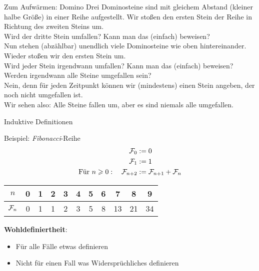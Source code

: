 \begin{frame}{Zum Aufwärmen: Domino}
	Drei Dominosteine sind mit gleichem Abstand (kleiner halbe Größe) in einer Reihe aufgestellt. Wir stoßen den ersten Stein der Reihe in Richtung des zweiten Steins um. \\
	Wird der dritte Stein umfallen? Kann man das (einfach) beweisen? \\[1em]
	\pause
	Nun stehen (abzählbar) unendlich viele Dominosteine wie oben hintereinander. Wieder stoßen wir den ersten Stein um. \\
	Wird jeder Stein irgendwann umfallen? Kann man das (einfach) beweisen? \\[1em]
	\pause
	Werden irgendwann alle Steine umgefallen sein? \\
	\pause Nein, denn für jeden Zeitpunkt können wir (mindestens) einen Stein angeben, der noch nicht umgefallen ist.\\
	Wir sehen also: Alle Steine fallen um, aber es sind niemals alle umgefallen.
\end{frame}

\newcommand{\Fib}{\mathcal{F}\hspace{-1pt}}

\begin{frame}{Induktive Definitionen}
	\begin{exampleblock}{Beispiel: \emph{Fibonacci}-Reihe}
		\begin{align*}
		\Fib_0 &:= 0 \\
		\Fib_1 &:= 1 \\
		\text{Für } n \geq 0: \quad \Fib_{n+2} &:= \Fib_{n+1} + \Fib_n 		
		\end{align*}
		\pause
		\begin{table}
			\centering
			\begin{tabular}{|c|c|c|c|c|c|c|c|c|c|c|}
				\hline
				$n$ & 0 & 1 & 2 & 3 & 4 & 5 & 6 & 7 & 8 & 9 \\ \hline
				$\Fib_n$ & 0 & 1 & 1 & 2 & 3 & 5 & 8 & 13 & 21 & 34 \\ \hline
			\end{tabular}
		\end{table}
		
		\pause
		\textbf{Wohldefiniertheit}: 
		\begin{itemize}
			\item Für alle Fälle etwas definieren 
			\item Nicht für einen Fall was Widersprüchliches definieren
		\end{itemize}
		
	\end{exampleblock}
	
\end{frame}

